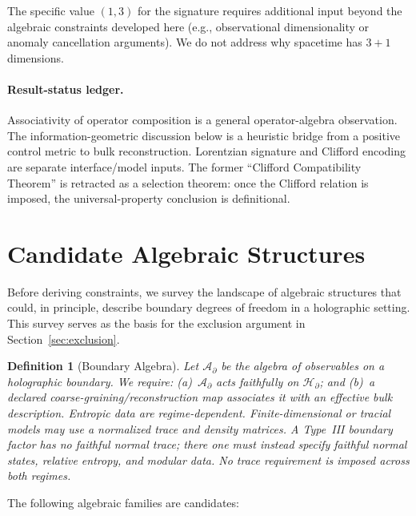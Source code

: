\documentclass[12pt]{article}
\newtheorem{definition}[theorem]{Definition}
\begin{document}
The specific value $(1,3)$ for the signature requires additional input beyond the algebraic constraints developed here (e.g., observational dimensionality or anomaly cancellation arguments).
We do not address why spacetime has $3+1$ dimensions.

\paragraph{Result-status ledger.}
Associativity of operator composition is a general operator-algebra observation.  The information-geometric discussion below is a heuristic bridge from a positive control metric to bulk reconstruction.  Lorentzian signature and Clifford encoding are separate interface/model inputs.  The former ``Clifford Compatibility Theorem'' is retracted as a selection theorem: once the Clifford relation is imposed, the universal-property conclusion is definitional.

\section{Candidate Algebraic Structures}
\label{sec:candidates}

Before deriving constraints, we survey the landscape of algebraic structures that could, in principle, describe boundary degrees of freedom in a holographic setting.
This survey serves as the basis for the exclusion argument in Section~\ref{sec:exclusion}.

\begin{definition}[Boundary Algebra]
Let $\mathcal{A}_\partial$ be the algebra of observables on a holographic boundary.
We require: (a)~$\mathcal{A}_\partial$ acts faithfully on $\mathcal{H}_\partial$; and (b)~a declared coarse-graining/reconstruction map associates it with an effective bulk description.  Entropic data are regime-dependent.  Finite-dimensional or tracial models may use a normalized trace and density matrices.  A Type~III boundary factor has no faithful normal trace; there one must instead specify faithful normal states, relative entropy, and modular data.  No trace requirement is imposed across both regimes.
\end{definition}

The following algebraic families are candidates:
\end{document}
